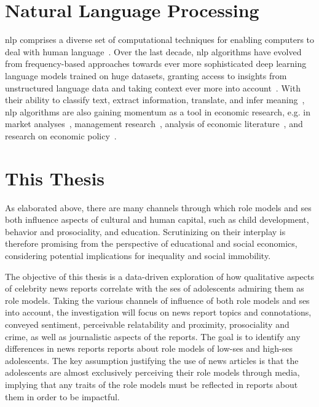\section{Natural Language Processing}\label{ch:nlp}
\gls{nlp} comprises a diverse set of computational techniques for enabling computers to deal with human language~\autocite{jurafsky_speech_2008}. Over the last decade, \gls{nlp} algorithms have evolved from frequency-based approaches towards ever more sophisticated deep learning language models trained on huge datasets, granting access to insights from unstructured language data and taking context ever more into account~\autocite{vajjala_practical_2020}. With their ability to classify text, extract information, translate, and infer meaning~\autocite{jurafsky_speech_2008}, \gls{nlp} algorithms are also gaining momentum as a tool in economic research, e.g. in market analyses~\autocite{hoberg_product_2010}, management research~\autocite{kang_natural_2020}, analysis of economic literature~\autocite{kim_keyword_2021,jelveh_detecting_2014,lambert_identifying_2021}, and research on economic policy~\autocite{elshehawy_sascat_2022}.


\section{This Thesis}\label{ch:this_thesis}
As elaborated above, there are many channels through which role models and \gls{ses} both influence aspects of cultural and human capital, such as child development, behavior and prosociality, and education. Scrutinizing on their interplay is therefore promising from the perspective of educational and social economics, considering potential implications for inequality and social immobility.

The objective of this thesis is a data-driven exploration of how qualitative aspects of celebrity news reports correlate with the \gls{ses} of adolescents admiring them as role models. Taking the various channels of influence of both role models and \gls{ses} into account, the investigation will focus on news report topics and connotations, conveyed sentiment, perceivable relatability and proximity, prosociality and crime, as well as journalistic aspects of the reports. The goal is to identify any differences in news reports reports about role models of low-\gls{ses} and high-\gls{ses} adolescents. The key assumption justifying the use of news articles is that the adolescents are almost exclusively perceiving their role models through media, implying that any traits of the role models must be reflected in reports about them in order to be impactful.

